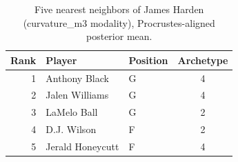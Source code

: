 \begin{table}[htbp]
  \centering\small
  \begin{tabular}{rllc}
    \toprule
    Rank & Player & Position & Archetype \\
    \midrule
    1 & Anthony Black & G & 4 \\
    2 & Jalen Williams & G & 4 \\
    3 & LaMelo Ball & G & 2 \\
    4 & D.J. Wilson & F & 2 \\
    5 & Jerald Honeycutt & F & 4 \\
    \bottomrule
  \end{tabular}
  \caption{Five nearest neighbors of James Harden (curvature_m3 modality), Procrustes-aligned posterior mean.}
  \label{tab:James_Harden_neighbors_curvature_m3}
\end{table}

